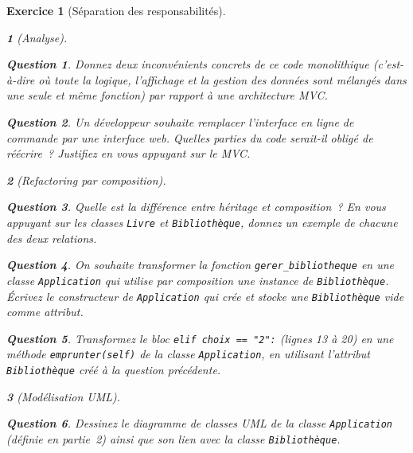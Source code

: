\documentclass{article}
\theoremstyle{exostyle}
\newtheorem{exo}{Exercice}
\theoremstyle{partiestyle}
\newtheorem{partie}{}[exo]
\theoremstyle{questionstyle}
\newtheorem{questionpartie}{Question}[partie]
\begin{document}
\begin{exo}[Séparation des responsabilités]
\begin{partie}[Analyse]
        \begin{questionpartie}
            Donnez deux inconvénients concrets de ce code monolithique (c'est-à-dire où toute la logique, l'affichage et la gestion des données sont mélangés dans une seule et même fonction) par rapport à une architecture MVC.
        \end{questionpartie}

        \begin{questionpartie}
            Un développeur souhaite remplacer l'interface en ligne de commande par une interface web. Quelles parties du code serait-il obligé de réécrire~? Justifiez en vous appuyant sur le MVC.
        \end{questionpartie}
    \end{partie}

    \begin{partie}[Refactoring par composition]

        \begin{questionpartie}
            Quelle est la différence entre héritage et composition~? En vous appuyant sur les classes \texttt{Livre} et \texttt{Bibliothèque}, donnez un exemple de chacune des deux relations.
        \end{questionpartie}

        \begin{questionpartie}
            On souhaite transformer la fonction \texttt{gerer\_bibliotheque} en une classe \texttt{Application} qui utilise par composition une instance de \texttt{Bibliothèque}. Écrivez le constructeur de \texttt{Application} qui crée et stocke une \texttt{Bibliothèque} vide comme attribut.
        \end{questionpartie}

        \begin{questionpartie}
            Transformez le bloc \texttt{elif choix == "2":} (lignes 13 à 20) en une méthode \texttt{emprunter(self)} de la classe \texttt{Application}, en utilisant l'attribut \texttt{Bibliothèque} créé à la question précédente.
        \end{questionpartie}

    \end{partie}

    \begin{partie}[Modélisation UML]

        \begin{questionpartie}
            Dessinez le diagramme de classes UML de la classe \texttt{Application} (définie en partie~2) ainsi que son lien avec la classe \texttt{Bibliothèque}.
        \end{questionpartie}


\end{partie}
\end{exo}
\end{document}
